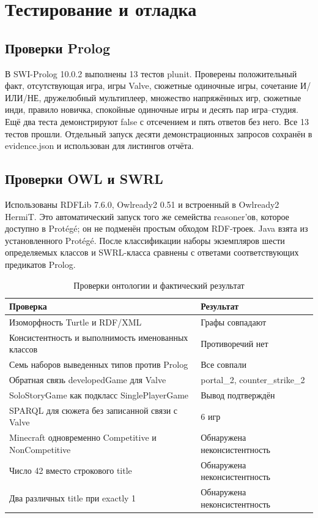 \section{Тестирование и отладка}
\subsection{Проверки Prolog}
В SWI-Prolog 10.0.2 выполнены 13 тестов plunit. Проверены положительный факт,
отсутствующая игра, игры Valve, сюжетные одиночные игры, сочетание И/ИЛИ/НЕ,
дружелюбный мультиплеер, множество напряжённых игр, сюжетные инди,
правило новичка, спокойные одиночные игры и десять пар игра--студия.
Ещё два теста демонстрируют false с отсечением и пять ответов без него.
Все 13 тестов прошли. Отдельный запуск десяти демонстрационных запросов
сохранён в evidence.json и использован для листингов отчёта.

\subsection{Проверки OWL и SWRL}
Использованы RDFLib 7.6.0, Owlready2 0.51 и встроенный в Owlready2 HermiT.
Это автоматический запуск того же семейства reasoner'ов, которое доступно
в Protégé; он не подменён простым обходом RDF-троек. Java взята из установленного Protégé.
После классификации наборы экземпляров шести определяемых классов и SWRL-класса
сравнены с ответами соответствующих предикатов Prolog.

\begin{table}[H]\centering\small
\caption{Проверки онтологии и фактический результат}
\begin{tabular}{P{8.7cm}P{5.5cm}}\toprule
Проверка & Результат\\\midrule
Изоморфность Turtle и RDF/XML & Графы совпадают\\
Консистентность и выполнимость именованных классов & Противоречий нет\\
Семь наборов выведенных типов против Prolog & Все совпали\\
Обратная связь developedGame для Valve & portal\_2, counter\_strike\_2\\
SoloStoryGame как подкласс SinglePlayerGame & Вывод подтверждён\\
SPARQL для сюжета без записанной связи с Valve & 6 игр\\
Minecraft одновременно Competitive и NonCompetitive & Обнаружена неконсистентность\\
Число 42 вместо строкового title & Обнаружена неконсистентность\\
Два различных title при exactly 1 & Обнаружена неконсистентность\\\bottomrule
\end{tabular}\end{table}

